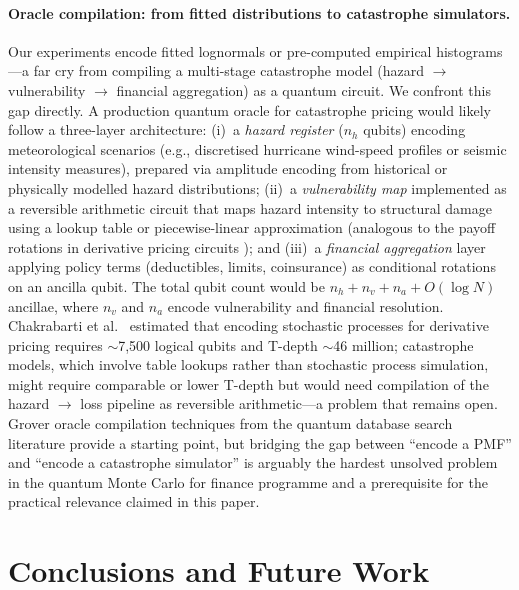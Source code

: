 \documentclass[11pt,a4paper]{article}
\begin{document}
\paragraph{Oracle compilation: from fitted distributions to catastrophe simulators.} Our experiments encode fitted lognormals or pre-computed empirical histograms---a far cry from compiling a multi-stage catastrophe model (hazard $\to$ vulnerability $\to$ financial aggregation) as a quantum circuit. We confront this gap directly. A production quantum oracle for catastrophe pricing would likely follow a three-layer architecture: (i)~a \emph{hazard register} ($n_h$ qubits) encoding meteorological scenarios (e.g., discretised hurricane wind-speed profiles or seismic intensity measures), prepared via amplitude encoding from historical or physically modelled hazard distributions; (ii)~a \emph{vulnerability map} implemented as a reversible arithmetic circuit that maps hazard intensity to structural damage using a lookup table or piecewise-linear approximation (analogous to the payoff rotations in derivative pricing circuits \cite{Stamatopoulos2024}); and (iii)~a \emph{financial aggregation} layer applying policy terms (deductibles, limits, coinsurance) as conditional rotations on an ancilla qubit. The total qubit count would be $n_h + n_v + n_a + O(\log N)$ ancillae, where $n_v$ and $n_a$ encode vulnerability and financial resolution. Chakrabarti et al.\ \cite{Chakrabarti2021} estimated that encoding stochastic processes for derivative pricing requires $\sim$7,500 logical qubits and T-depth $\sim$46 million; catastrophe models, which involve table lookups rather than stochastic process simulation, might require comparable or lower T-depth but would need compilation of the hazard $\to$ loss pipeline as reversible arithmetic---a problem that remains open. Grover oracle compilation techniques from the quantum database search literature provide a starting point, but bridging the gap between ``encode a PMF'' and ``encode a catastrophe simulator'' is arguably the hardest unsolved problem in the quantum Monte Carlo for finance programme and a prerequisite for the practical relevance claimed in this paper.


\section{Conclusions and Future Work}
\label{sec:conclusions}
\end{document}
